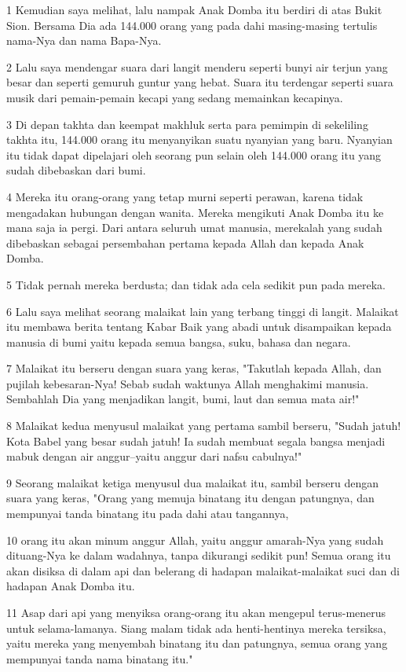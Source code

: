 \par 1 Kemudian saya melihat, lalu nampak Anak Domba itu berdiri di atas Bukit Sion. Bersama Dia ada 144.000 orang yang pada dahi masing-masing tertulis nama-Nya dan nama Bapa-Nya.
\par 2 Lalu saya mendengar suara dari langit menderu seperti bunyi air terjun yang besar dan seperti gemuruh guntur yang hebat. Suara itu terdengar seperti suara musik dari pemain-pemain kecapi yang sedang memainkan kecapinya.
\par 3 Di depan takhta dan keempat makhluk serta para pemimpin di sekeliling takhta itu, 144.000 orang itu menyanyikan suatu nyanyian yang baru. Nyanyian itu tidak dapat dipelajari oleh seorang pun selain oleh 144.000 orang itu yang sudah dibebaskan dari bumi.
\par 4 Mereka itu orang-orang yang tetap murni seperti perawan, karena tidak mengadakan hubungan dengan wanita. Mereka mengikuti Anak Domba itu ke mana saja ia pergi. Dari antara seluruh umat manusia, merekalah yang sudah dibebaskan sebagai persembahan pertama kepada Allah dan kepada Anak Domba.
\par 5 Tidak pernah mereka berdusta; dan tidak ada cela sedikit pun pada mereka.
\par 6 Lalu saya melihat seorang malaikat lain yang terbang tinggi di langit. Malaikat itu membawa berita tentang Kabar Baik yang abadi untuk disampaikan kepada manusia di bumi yaitu kepada semua bangsa, suku, bahasa dan negara.
\par 7 Malaikat itu berseru dengan suara yang keras, "Takutlah kepada Allah, dan pujilah kebesaran-Nya! Sebab sudah waktunya Allah menghakimi manusia. Sembahlah Dia yang menjadikan langit, bumi, laut dan semua mata air!"
\par 8 Malaikat kedua menyusul malaikat yang pertama sambil berseru, "Sudah jatuh! Kota Babel yang besar sudah jatuh! Ia sudah membuat segala bangsa menjadi mabuk dengan air anggur--yaitu anggur dari nafsu cabulnya!"
\par 9 Seorang malaikat ketiga menyusul dua malaikat itu, sambil berseru dengan suara yang keras, "Orang yang memuja binatang itu dengan patungnya, dan mempunyai tanda binatang itu pada dahi atau tangannya,
\par 10 orang itu akan minum anggur Allah, yaitu anggur amarah-Nya yang sudah dituang-Nya ke dalam wadahnya, tanpa dikurangi sedikit pun! Semua orang itu akan disiksa di dalam api dan belerang di hadapan malaikat-malaikat suci dan di hadapan Anak Domba itu.
\par 11 Asap dari api yang menyiksa orang-orang itu akan mengepul terus-menerus untuk selama-lamanya. Siang malam tidak ada henti-hentinya mereka tersiksa, yaitu mereka yang menyembah binatang itu dan patungnya, semua orang yang mempunyai tanda nama binatang itu."
